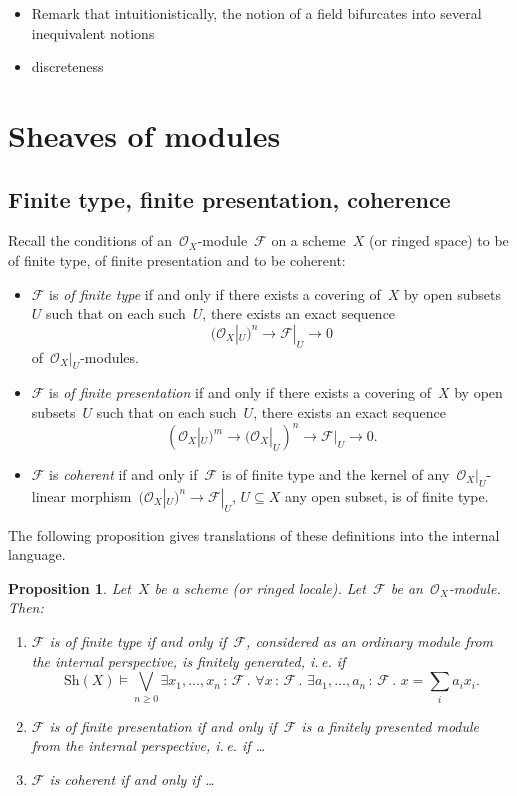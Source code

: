 \documentclass[10pt]{amsart}
\theoremstyle{definition}
\theoremstyle{plain}
\newtheorem{prop}[defn]{Proposition}
\theoremstyle{remark}
\newcommand{\F}{\mathcal{F}}
\renewcommand{\O}{\mathcal{O}}
\newcommand{\Sh}{\mathrm{Sh}}
\newcommand{\?}{\,{:}\,}
\renewcommand{\_}{\mathpunct{.}\,}
\begin{document}
\begin{itemize}
\item Remark that intuitionistically, the notion of a field bifurcates into
several inequivalent notions
\item discreteness
\end{itemize}

\section{Sheaves of modules}

\subsection{Finite type, finite presentation, coherence}
Recall the conditions of an~$\O_X$-module~$\F$ on a scheme~$X$ (or ringed
space) to be of finite type, of finite presentation and to be coherent:
\begin{itemize}
\item $\F$ is \emph{of finite type} if and only if there exists a covering of~$X$ by
open subsets~$U$ such that on each such~$U$, there exists an exact sequence
\[ (\O_X|_U)^n \longrightarrow \F|_U \longrightarrow 0 \]
of~$\O_X|_U$-modules.
\item $\F$ is \emph{of finite presentation} if and only if there exists a covering of~$X$ by
open subsets~$U$ such that on each such~$U$, there exists an exact sequence
\[ (\O_X|_U)^m \longrightarrow (\O_X|_U)^n \longrightarrow \F|_U \longrightarrow 0. \]
\item $\F$ is \emph{coherent} if and only if~$\F$ is of finite type and the
kernel of any~$\O_X|_U$-linear morphism~$(\O_X|_U)^n \to \F|_U$, $U \subseteq
X$ any open subset, is of finite type.
\end{itemize}

The following proposition gives translations of these definitions into the
internal language.
\begin{prop}Let~$X$ be a scheme (or ringed locale). Let~$\F$ be
an~$\O_X$-module. Then:
\begin{enumerate}
\item $\F$ is of finite type if and only if~$\F$, considered as an ordinary
module from the internal perspective, is finitely generated, i.\,e. if
\[ \Sh(X) \models
  \bigvee_{n \geq 0}
  \exists x_1,\ldots,x_n\?\F\_
  \forall x\?\F\_
  \exists a_1,\ldots,a_n\?\F\_
  x = \textstyle\sum\limits_i a_i x_i. \]
\item $\F$ is of finite presentation if and only if~$\F$ is a finitely
presented module from the internal perspective, i.\,e. if \ldots
\item $\F$ is coherent if and only if \ldots
\end{enumerate}
\end{prop}
\end{document}
